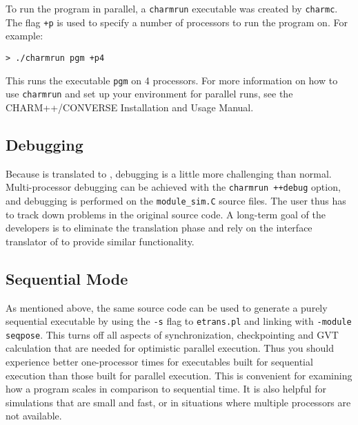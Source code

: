 To run the program in parallel, a {\tt charmrun} executable was
created by {\tt charmc}.  The flag {\tt +p} is used to specify a
number of processors to run the program on.  For example:

\begin{verbatim}
> ./charmrun pgm +p4
\end{verbatim}

This runs the executable {\tt pgm} on 4 processors.  For more
information on how to use {\tt charmrun} and set up your environment
for parallel runs, see the CHARM++/CONVERSE Installation and Usage
Manual. 

\subsection{Debugging}

Because \pose{} is translated to \charmpp{}, debugging is a little
more challenging than normal.  Multi-processor debugging can be
achieved with the {\tt charmrun ++debug} option, and debugging is
performed on the {\tt module\_sim.C} source files.  The user thus has
to track down problems in the original \pose{} source code.  A
long-term goal of the \pose{} developers is to eliminate the
translation phase and rely on the interface translator of \charmpp{}
to provide similar functionality.

\subsection{Sequential Mode}

As mentioned above, the same source code can be used to generate a
purely sequential \pose{} executable by using the {\tt -s} flag to
{\tt etrans.pl} and linking with {\tt -module seqpose}.  This turns
off all aspects of synchronization, checkpointing and GVT calculation
that are needed for optimistic parallel execution.  Thus you should
experience better one-processor times for executables built for
sequential execution than those built for parallel execution.  This is
convenient for examining how a program scales in comparison to
sequential time.  It is also helpful for simulations that are small
and fast, or in situations where multiple processors are not
available.



